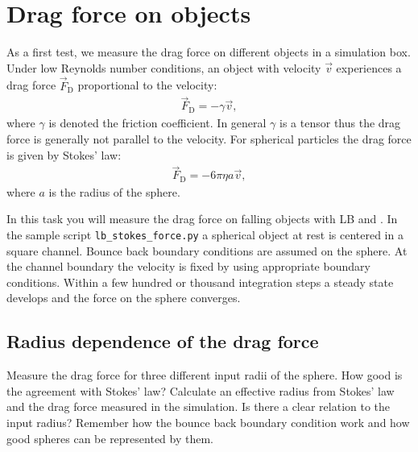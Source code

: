 \section{Drag force on objects}
As a first test, we measure the drag force on different objects in a simulation
box. Under low Reynolds number conditions, an object with velocity $\vec{v}$
experiences a drag force $\vec{F}_\text{D}$ proportional to the velocity:
\begin{align*}
	\vec{F}_\text{D}=-\gamma\vec{v},
\end{align*}
where $\gamma$ is denoted the friction coefficient. In general $\gamma$ is a
tensor thus the drag force is generally not parallel to the velocity. For
spherical particles the drag force is given by Stokes' law:
\begin{align*}
	\vec{F}_\text{D}=-6\pi\eta a\vec{v},
\end{align*}
where $a$ is the radius of the sphere.

In this task you will measure the drag force on falling objects with LB and
\ES{}. In the sample script \texttt{lb\_stokes\_force.py} a spherical object at rest
is centered in a square channel. Bounce back boundary conditions are assumed on
the sphere. At the channel boundary the velocity is fixed by using appropriate
boundary conditions. Within a few hundred or thousand  integration steps a
steady state develops and the force on the sphere converges.

\subsection*{Radius dependence of the drag force}
Measure the drag force for three different input radii of the sphere. How good
is the agreement with Stokes' law? Calculate an effective radius from Stokes'
law and the drag force measured in the simulation. Is there a clear relation to
the input radius? Remember how the bounce back boundary condition work and how
good spheres can be represented by them.

